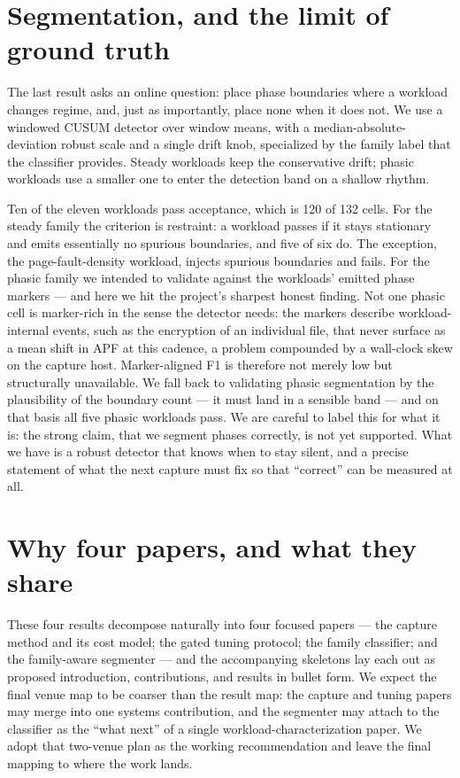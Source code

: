 \documentclass[11pt]{article}
\begin{document}
\section{Segmentation, and the limit of ground truth}

The last result asks an online question: place phase boundaries where a workload
changes regime, and, just as importantly, place none when it does not. We use a
windowed CUSUM detector over window means, with a median-absolute-deviation
robust scale and a single drift knob, specialized by the family label that the
classifier provides. Steady workloads keep the conservative drift; phasic
workloads use a smaller one to enter the detection band on a shallow rhythm.

Ten of the eleven workloads pass acceptance, which is 120 of 132 cells. For the
steady family the criterion is restraint: a workload passes if it stays
stationary and emits essentially no spurious boundaries, and five of six do. The
exception, the page-fault-density workload, injects spurious boundaries and
fails. For the phasic family we intended to validate against the workloads'
emitted phase markers --- and here we hit the project's sharpest honest finding.
Not one phasic cell is marker-rich in the sense the detector needs: the markers
describe workload-internal events, such as the encryption of an individual file,
that never surface as a mean shift in APF at this cadence, a problem compounded
by a wall-clock skew on the capture host. Marker-aligned F1 is therefore not
merely low but structurally unavailable. We fall back to validating phasic
segmentation by the plausibility of the boundary count --- it must land in a
sensible band --- and on that basis all five phasic workloads pass. We are
careful to label this for what it is: the strong claim, that we segment phases
correctly, is not yet supported. What we have is a robust detector that knows
when to stay silent, and a precise statement of what the next capture must fix
so that ``correct'' can be measured at all.

\section{Why four papers, and what they share}

These four results decompose naturally into four focused papers --- the capture
method and its cost model; the gated tuning protocol; the family classifier; and
the family-aware segmenter --- and the accompanying skeletons lay each out as
proposed introduction, contributions, and results in bullet form. We expect the
final venue map to be coarser than the result map: the capture and tuning papers
may merge into one systems contribution, and the segmenter may attach to the
classifier as the ``what next'' of a single workload-characterization paper. We
adopt that two-venue plan as the working recommendation and leave the final
mapping to where the work lands.
\end{document}
